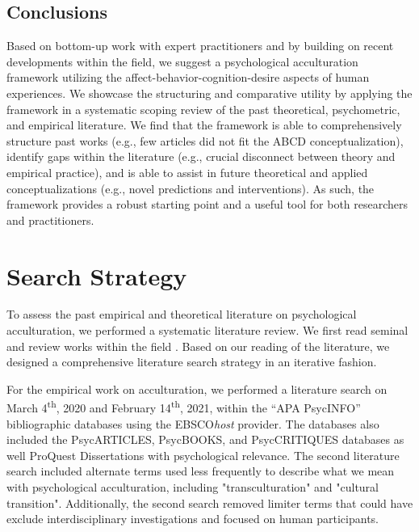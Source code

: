 \documentclass[man, 12pt, a4paper, mask]{apa7}
\begin{document}
\subsection{Conclusions}
Based on bottom-up work with expert practitioners and by building on recent developments within the field, we suggest a psychological acculturation framework utilizing the affect-behavior-cognition-desire aspects of human experiences. We showcase the structuring and comparative utility by applying the framework in a systematic scoping review of the past theoretical, psychometric, and empirical literature. We find that the framework is able to comprehensively structure past works (e.g., few articles did not fit the ABCD conceptualization), identify gaps within the literature (e.g., crucial disconnect between theory and empirical practice), and is able to assist in future theoretical and applied conceptualizations (e.g., novel predictions and interventions). As such, the framework provides a robust starting point and a useful tool for both researchers and practitioners.


\printbibliography

\appendix

\section{Search Strategy}
\label{app:AppendixSearchStrategy}

To assess the past empirical and theoretical literature on psychological acculturation, we performed a systematic literature review. We first read seminal and review works within the field \citep[including,][]{Ward2019, Berry1997b, Berry2003, Szapocznik1978, Sam2006a, Rudmin2003a}. Based on our reading of the literature, we designed a comprehensive literature search strategy in an iterative fashion. 

For the empirical work on acculturation, we performed a literature search on March 4\textsuperscript{th}, 2020 and February 14\textsuperscript{th}, 2021, within the ``APA PsycINFO'' bibliographic databases using the EBSCO\textit{host} provider. The databases also included the PsycARTICLES, PsycBOOKS, and PsycCRITIQUES databases as well ProQuest Dissertations with psychological relevance. The second literature search included alternate terms used less frequently to describe what we mean with psychological acculturation, including "transculturation" and "cultural transition". Additionally, the second search removed limiter terms that could have exclude interdisciplinary investigations and focused on human participants.
\end{document}

